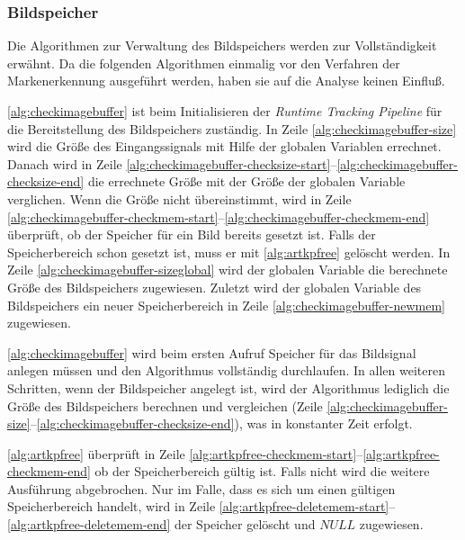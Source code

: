 \subsubsection{Bildspeicher} %
\label{sec:bildspeicher}

Die Algorithmen zur Verwaltung des Bildspeichers werden zur Vollständigkeit erwähnt. Da die folgenden Algorithmen
 einmalig vor den Verfahren der Markenerkennung ausgeführt werden, haben sie auf die Analyse keinen Einfluß.

\autoref{alg:checkimagebuffer} ist beim Initialisieren der \textit{Runtime Tracking Pipeline} für die Bereitstellung
 des Bildspeichers zuständig. In Zeile \ref{alg:checkimagebuffer-size} wird die Größe des Eingangssignals mit Hilfe der
 globalen Variablen errechnet. Danach wird in Zeile
 \ref{alg:checkimagebuffer-checksize-start}--\ref{alg:checkimagebuffer-checksize-end} die errechnete Größe mit der
 Größe der globalen Variable verglichen. Wenn die Größe nicht übereinstimmt, wird in Zeile
 \ref{alg:checkimagebuffer-checkmem-start}--\ref{alg:checkimagebuffer-checkmem-end} überprüft, ob der Speicher für ein
 Bild bereits gesetzt ist. Falls der Speicherbereich schon gesetzt ist, muss er mit \autoref{alg:artkpfree} gelöscht
 werden. In Zeile \ref{alg:checkimagebuffer-sizeglobal} wird der globalen Variable die berechnete Größe des
 Bildspeichers zugewiesen. Zuletzt wird der globalen Variable des Bildspeichers ein neuer Speicherbereich in Zeile
 \ref{alg:checkimagebuffer-newmem} zugewiesen.



\autoref{alg:checkimagebuffer} wird beim ersten Aufruf Speicher für das Bildsignal anlegen müssen und den Algorithmus
 vollständig durchlaufen. In allen weiteren Schritten, wenn der Bildspeicher angelegt ist, wird der Algorithmus
 lediglich die Größe des Bildspeichers berechnen und vergleichen
 (Zeile \ref{alg:checkimagebuffer-size}--\ref{alg:checkimagebuffer-checksize-end}), was in konstanter Zeit erfolgt.

\autoref{alg:artkpfree} überprüft in Zeile \ref{alg:artkpfree-checkmem-start}--\ref{alg:artkpfree-checkmem-end} ob der
 Speicherbereich gültig ist. Falls nicht wird die weitere Ausführung abgebrochen. Nur im Falle, dass es sich um einen
 gültigen Speicherbereich handelt, wird in Zeile \ref{alg:artkpfree-deletemem-start}--\ref{alg:artkpfree-deletemem-end}
 der Speicher gelöscht und $\mathit{NULL}$ zugewiesen.



